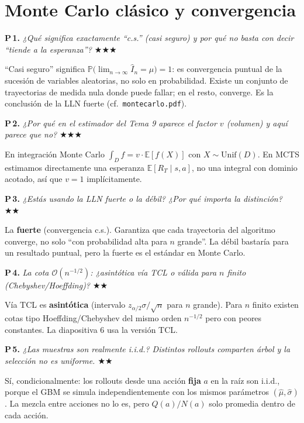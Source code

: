 \documentclass[11pt,a4paper]{article}
\newcommand{\preg}[2]{%
  \par\medskip
  \noindent\textbf{P\,#1.} \emph{#2}\par\smallskip}
\newcommand{\resp}[1]{%
  \noindent #1\par}
\begin{document}
\newpage

\section{Monte Carlo clásico y convergencia}

\preg{1}{¿Qué significa exactamente ``c.s.'' (casi seguro) y por qué no
basta con decir ``tiende a la esperanza''? \hfill$\bigstar\bigstar\bigstar$}
\resp{%
``Casi seguro'' significa
$\mathbb{P}\bigl(\lim_{n\to\infty}\widehat I_n = \mu\bigr)=1$:
es convergencia puntual de la sucesión de variables aleatorias, no solo
en probabilidad. Existe un conjunto de trayectorias de medida nula donde
puede fallar; en el resto, converge. Es la conclusión de la LLN fuerte
(cf.\ \texttt{montecarlo.pdf}).}

\preg{2}{¿Por qué en el estimador del Tema 9 aparece el factor $v$ (volumen)
y aquí parece que no? \hfill$\bigstar\bigstar\bigstar$}
\resp{%
En integración Monte Carlo $\int_D f = v\cdot\mathbb{E}[f(X)]$ con
$X\sim\text{Unif}(D)$. En MCTS estimamos directamente una esperanza
$\mathbb{E}[R_T\mid s,a]$, no una integral con dominio acotado, así que
$v=1$ implícitamente.}

\preg{3}{¿Estás usando la LLN fuerte o la débil? ¿Por qué importa la
distinción? \hfill$\bigstar\bigstar$}
\resp{%
La \textbf{fuerte} (convergencia c.s.). Garantiza que cada trayectoria del
algoritmo converge, no solo ``con probabilidad alta para $n$ grande''.
La débil bastaría para un resultado puntual, pero la fuerte es el
estándar en Monte Carlo.}

\preg{4}{La cota $\mathcal{O}(n^{-1/2})$: ¿asintótica vía TCL o válida para
$n$ finito (Chebyshev/Hoeffding)? \hfill$\bigstar\bigstar$}
\resp{%
Vía TCL es \textbf{asintótica} (intervalo $z_{\alpha/2}\sigma/\sqrt{n}$
para $n$ grande). Para $n$ finito existen cotas tipo Hoeffding/Chebyshev
del mismo orden $n^{-1/2}$ pero con peores constantes. La diapositiva 6
usa la versión TCL.}

\preg{5}{¿Las muestras son realmente i.i.d.? Distintos rollouts comparten
árbol y la selección no es uniforme. \hfill$\bigstar\bigstar$}
\resp{%
Sí, condicionalmente: los rollouts desde una acción \textbf{fija} $a$ en la
raíz son i.i.d., porque el GBM se simula independientemente con los mismos
parámetros $(\hat\mu,\hat\sigma)$. La mezcla entre acciones no lo es,
pero $Q(a)/N(a)$ solo promedia dentro de cada acción.}
\end{document}
